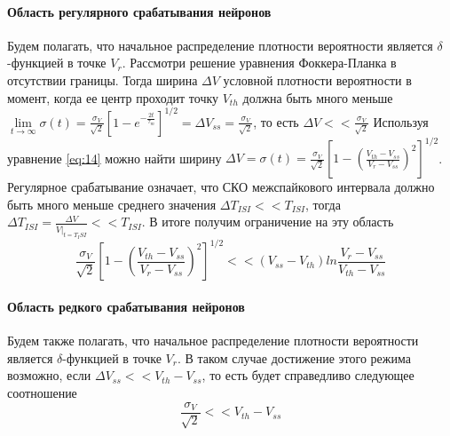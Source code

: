 \paragraph{Область регулярного срабатывания нейронов}

Будем полагать, что начальное распределение плотности вероятности является $\delta$-функцией в точке $V_r$. Рассмотри решение уравнения Фоккера-Планка в отсутствии границы. Тогда ширина $\Delta V$ условной плотности вероятности в момент, когда ее центр проходит точку $V_{th}$ должна быть много меньше $\displaystyle \lim\limits_{t\to\infty}\sigma(t)=\frac{\sigma_V}{\sqrt{2}}\left[1-e^{-\frac{2t}{\tau_m}}\right]^{1/2}=\Delta V_{ss}=\frac{\sigma_V}{\sqrt{2}}$, то есть $\displaystyle \Delta V<<\frac{\sigma_V}{\sqrt{2}}$
Используя уравнение \eqref{eq:14} можно найти ширину $\displaystyle \Delta V=\sigma(t)=\frac{\sigma_V}{\sqrt{2}}\left[1-\left(\frac{V_{th}-V_{ss}}{V_r-V_{ss}}\right)^2\right]^{1/2}$. Регулярное срабатывание означает, что СКО межспайкового интервала должно быть много меньше среднего значения $\Delta T_{ISI}<<T_{ISI}$, тогда $\displaystyle\Delta T_{ISI}=\frac{\Delta V}{\dot{V}|_{t=T_ISI}}<<T_{ISI}$. В итоге получим ограничение на эту область
\begin{equation}
\frac{\sigma_V}{\sqrt{2}}\left[1-\left(\frac{V_{th}-V_{ss}}{V_r-V_{ss}}\right)^2\right]^{1/2}<<(V_{ss}-V_{th})ln\frac{V_r-V_{ss}}{V_{th}-V_{ss}}
\label{eq:17}
\end{equation}
\paragraph{Область редкого срабатывания нейронов}
Будем также полагать, что начальное распределение плотности вероятности является $\delta$-функцией в точке $V_r$. В таком случае достижение этого режима возможно, если $\Delta V_{ss}<<V_{th}-V_{ss}$, то есть будет справедливо следующее соотношение 
\begin{equation}
\frac{\sigma_V}{\sqrt{2}}<<V_{th}-V_{ss}
\label{eq:18}
\end{equation}

